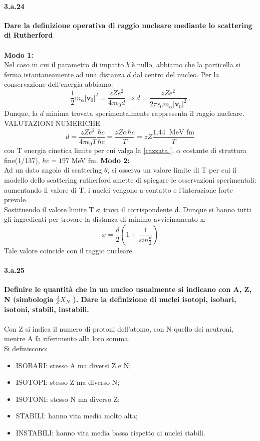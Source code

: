 \documentclass[twoside]{article}
\begin{document}
\paragraph{3.a.24}\textbf{Dare la definizione operativa di raggio nucleare mediante lo scattering di Rutherford}\\
\\
\textbf{Modo 1:}\\
Nel caso in cui il parametro di impatto $b$ è nullo, abbiamo che la particella si ferma istantaneamente ad una distanza $d$ dal centro del nucleo. Per la conservazione dell'energia abbiamo:
\begin{equation} \label{cazzata.}
\frac{1}{2}m_{\alpha} |\mathbf{v}_0|^2=\frac{z Z e^2}{4\pi \epsilon_0 d} \Rightarrow d=\frac{z Z e^2}{2\pi \epsilon_0 m_{\alpha} |\mathbf{v}_0|^2} \, .
\end{equation}
Dunque, la $d$ minima trovata sperimentalmente rappresenta il raggio nucleare.\\
VALUTAZIONI NUMERICHE\\
\begin{equation*}
    d=\frac{z Z e^2}{4\pi \epsilon_0 T}\frac{\hbar c}{\hbar c}= \frac{zZ\alpha\hbar c}{T}=zZ\frac{1.44 \;\; \text{MeV fm}}{T}
\end{equation*}
con T energia cinetica limite per cui valga la \ref{cazzata.}, $\alpha$ costante di struttura fine(1/137), $\hbar c=197$ MeV fm.
\textbf{Modo 2:}\\
Ad un dato angolo di scattering $\theta$, si osserva un valore limite di T per cui il modello dello scattering rutherford smette di spiegare le osservazioni sperimentali: aumentando il valore di T, i nuclei vengono a contatto e l'interazione forte prevale.\\
Sostituendo il valore limite T si trova il corrispondente d. Dunque si hanno tutti gli ingredienti per trovare la distanza di minimo avvicinamento x:
\begin{equation}
    x=\frac{d}{2}\left(1+\frac{1}{sin\frac{\theta}{2}}\right)
\end{equation}
Tale valore coincide con il raggio nucleare.
\paragraph{3.a.25}\textbf{Definire le quantità che in un nucleo usualmente si indicano con A, Z, N
(simbologia $^A_ZX_N$ ). Dare la definizione di nuclei isotopi, isobari, isotoni, stabili,
instabili.}\\ \\
Con Z si indica il numero di protoni dell'atomo, con N quello dei neutroni, mentre A fa riferimento alla loro somma.\\
Si definiscono:
\begin{itemize}
    \item ISOBARI: stesso A ma diversi Z e N;
    \item ISOTOPI: stesso Z ma diverso N;
    \item ISOTONI: stesso N ma diverso Z;
    \item STABILI: hanno vita media molto alta;
    \item INSTABILI: hanno vita media bassa rispetto ai nuclei stabili.
\end{itemize}
\end{document}
